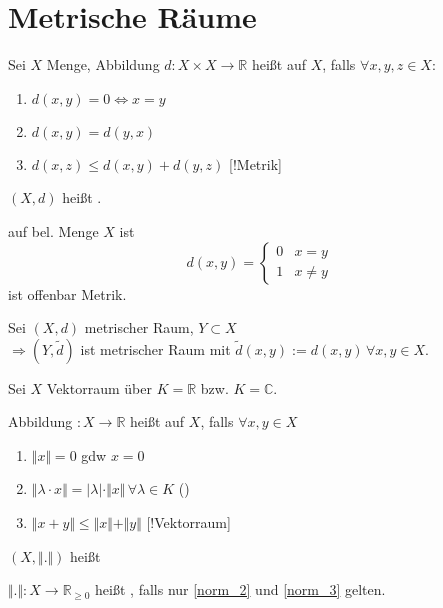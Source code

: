\section{Metrische Räume}
\begin{*definition}[Metrik]
	Sei $X$ Menge, Abbildung $d:X\times X\rightarrow \mathbb{R}$ heißt  auf $X$, falls $\forall x,y,z\in X$:
	\begin{enumerate}[label={\alph*)}]
		\item $d(x,y) = 0 \Leftrightarrow x=y$
		\item $d(x,y) = d(y,x)$ 
		\item $d(x,z)\le d(x,y) + d(y,z)$ [!Metrik]
	\end{enumerate}

	$(X,d)$ heißt .
\end{*definition}
\begin{example}
	 auf bel. Menge $X$ ist \[ d(x,y) = \begin{cases}0& x=y \\ 1 & x\neq y \end{cases} \] ist offenbar Metrik.
\end{example}
\begin{example}
	Sei $(X,d)$ metrischer Raum, $Y\subset X$\\
	$\Rightarrow (Y,\tilde{d})$ ist metrischer Raum mit  $\tilde{d}(x,y) := d(x,y)\,\forall x,y\in X$.
\end{example}

\begin{*definition}[Norm]
	Sei $X$ Vektorraum über $K=\mathbb{R}$ bzw. $K=\mathbb{C}$.
	
	Abbildung $: X\rightarrow\mathbb{R}$ heißt  auf $X$, falls $\forall x,y\in X$
	\begin{enumerate}[label={\alph*)}]
		\item $\Vert x\Vert = 0$ \gls{gdw} $x = 0$
		\item \label{norm_2} $\Vert \lambda\cdot x\Vert = |\lambda| \cdot \Vert x \Vert\,\forall \lambda\in K$ ()
		\item \label{norm_3} $\Vert x + y\Vert \le \Vert x \Vert + \Vert y \Vert$ [!Vektorraum]
	\end{enumerate}

	$(X,\Vert . \Vert)$ heißt 
\end{*definition}
\begin{*definition}[Halbnorm]
	$\Vert . \Vert:X\rightarrow\mathbb{R}_{\ge0}$ heißt , falls nur \ref{norm_2} und \ref{norm_3} gelten.
\end{*definition}

